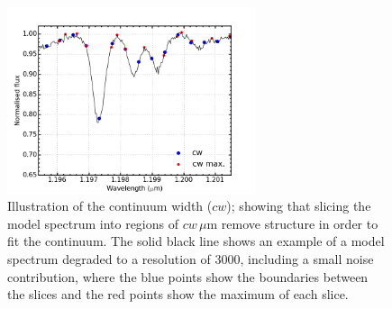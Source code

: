 \begin{figure}
 \centering
\includegraphics[width=0.65\textwidth]{JAnal/cw}
\caption[Illustration of continuum width slices and maxima on diagnostic lines]{
Illustration of the continuum width ($cw$); showing that slicing the model spectrum into regions of $cw\,\mu$m remove structure in order to fit the continuum.
The solid black line shows an example of a model spectrum degraded to a resolution of 3000, including a small noise contribution,
where the blue points show the boundaries between the slices and the red points show the maximum of each slice.\label{fig:cw}
         }
\end{figure}


